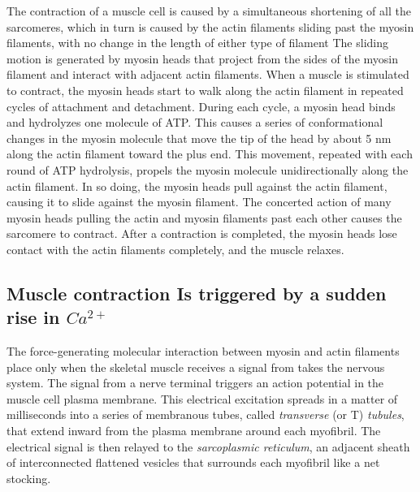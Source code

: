 The contraction of a muscle cell is caused by a simultaneous shortening
of all the sarcomeres, which in turn is caused by the actin filaments sliding
past the myosin filaments, with no change in the length of either type
of filament The sliding motion is generated by myosin
heads that project from the sides of the myosin filament and interact with
adjacent actin filaments. When a muscle is stimulated to contract, the
myosin heads start to walk along the actin filament in repeated cycles
of attachment and detachment. During each cycle, a myosin head binds
and hydrolyzes one molecule of ATP. This causes a series of conformational
changes in the myosin molecule that move the tip of the head by
about 5 nm along the actin filament toward the plus end. This movement,
repeated with each round of ATP hydrolysis, propels the myosin molecule
unidirectionally along the actin filament. In so doing, the
myosin heads pull against the actin filament, causing it to slide against
the myosin filament. The concerted action of many myosin heads pulling
the actin and myosin filaments past each other causes the sarcomere to
contract. After a contraction is completed, the myosin heads lose contact
with the actin filaments completely, and the muscle relaxes.

\subsection{Muscle contraction Is triggered by a sudden rise in $Ca^{2+}$}

The force-generating molecular interaction between myosin and actin filaments
place only when the skeletal muscle receives a signal from takes
the nervous system. The signal from a nerve terminal triggers an action
potential in the muscle cell plasma membrane.
This electrical excitation spreads in a matter of milliseconds into a series
of membranous tubes, called \textit{transverse} (or T) \textit{tubules}, that extend inward
from the plasma membrane around each myofibril. The electrical signal
is then relayed to the \textit{sarcoplasmic reticulum}, an adjacent sheath of
interconnected flattened vesicles that surrounds each myofibril like a net
stocking.

